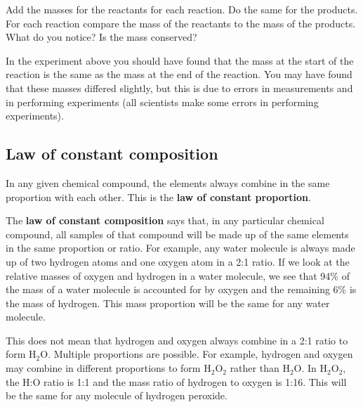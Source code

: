     \par
  \label{m38711*eip-634}Add the masses for the reactants for each reaction. Do the same for the products. For each reaction compare the mass of the reactants to the mass of the products. What do you notice? Is the mass conserved?\par \label{m38711*eip-65}In the experiment above you should have found that the mass at the start of the reaction is the same as the mass at the end of the reaction. You may have found that these masses differed slightly, but this is due to errors in measurements and in performing experiments (all scientists make some errors in performing experiments).  \par 
    \label{m38711*cid6}
            \subsection{ Law of constant composition}
            \nopagebreak
      \label{m38711*id65065}In any given chemical compound, the elements always combine in the same proportion with each other. This is the \textbf{law of constant proportion}.\par 
      \label{m38711*id65075}The \textbf{law of constant composition} says that, in any particular chemical compound, all samples of that compound will be made up of the same elements in the same proportion or ratio. For example, any water molecule is always made up of two hydrogen atoms and one oxygen atom in a 2:1 ratio. If we look at the relative masses of oxygen and hydrogen in a water molecule, we see that 94\% of the mass of a water molecule is accounted for by oxygen and the remaining 6\% is the mass of hydrogen. This mass proportion will be the same for any water molecule.\par 
      \label{m38711*id65089}This does not mean that hydrogen and oxygen always combine in a 2:1 ratio to form $\mathrm{H}{}_{2}\mathrm{O}$. Multiple proportions are possible. For example, hydrogen and oxygen may combine in different proportions to form $\mathrm{H}{}_{2}\mathrm{O}{}_{2}$ rather than $\mathrm{H}{}_{2}\mathrm{O}$. In $\mathrm{H}{}_{2}\mathrm{O}{}_{2}$, the H:O ratio is 1:1 and the mass ratio of hydrogen to oxygen is 1:16. This will be the same for any molecule of hydrogen peroxide.\par 
    \label{m38711*cid7}

